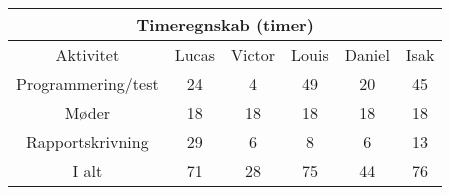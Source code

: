 \centering
\begin{tabular}{ |c|c|c|c|c|c|  }
 \hline
 \multicolumn{6}{|c|}{Timeregnskab (timer)} \\
 \hline
 Aktivitet & Lucas & Victor & Louis & Daniel & Isak\\
 \hline
 
 
 Programmering/test      & 24 & 4 & 49 & 20 & 45 \\
 
 Møder              & 18 & 18 & 18 & 18 & 18 \\
 
 Rapportskrivning   & 29 & 6 & 8 & 6 & 13 \\
 
 \hline
 
 I alt              & 71 & 28 & 75 & 44 & 76 \\
 
 
 \hline
\end{tabular}